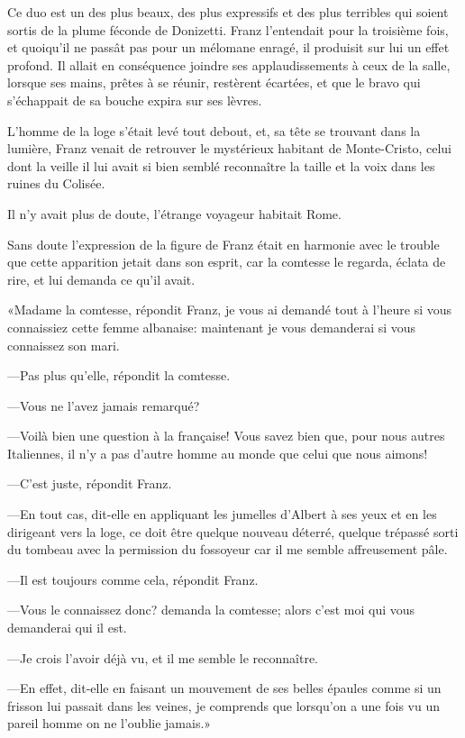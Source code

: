 Ce duo est un des plus beaux, des plus expressifs et des plus terribles qui soient sortis de la plume féconde de Donizetti. Franz l'entendait pour la troisième fois, et quoiqu'il ne passât pas pour un mélomane enragé, il produisit sur lui un effet profond. Il allait en conséquence joindre ses applaudissements à ceux de la salle, lorsque ses mains, prêtes à se réunir, restèrent écartées, et que le bravo qui s'échappait de sa bouche expira sur ses lèvres. 

L'homme de la loge s'était levé tout debout, et, sa tête se trouvant dans la lumière, Franz venait de retrouver le mystérieux habitant de Monte-Cristo, celui dont la veille il lui avait si bien semblé reconnaître la taille et la voix dans les ruines du Colisée. 

Il n'y avait plus de doute, l'étrange voyageur habitait Rome. 

Sans doute l'expression de la figure de Franz était en harmonie avec le trouble que cette apparition jetait dans son esprit, car la comtesse le regarda, éclata de rire, et lui demanda ce qu'il avait. 

«Madame la comtesse, répondit Franz, je vous ai demandé tout à l'heure si vous connaissiez cette femme albanaise: maintenant je vous demanderai si vous connaissez son mari. 

—Pas plus qu'elle, répondit la comtesse. 

—Vous ne l'avez jamais remarqué? 

—Voilà bien une question à la française! Vous savez bien que, pour nous autres Italiennes, il n'y a pas d'autre homme au monde que celui que nous aimons! 

—C'est juste, répondit Franz. 

—En tout cas, dit-elle en appliquant les jumelles d'Albert à ses yeux et en les dirigeant vers la loge, ce doit être quelque nouveau déterré, quelque trépassé sorti du tombeau avec la permission du fossoyeur car il me semble affreusement pâle. 

—Il est toujours comme cela, répondit Franz. 

—Vous le connaissez donc? demanda la comtesse; alors c'est moi qui vous demanderai qui il est. 

—Je crois l'avoir déjà vu, et il me semble le reconnaître. 

—En effet, dit-elle en faisant un mouvement de ses belles épaules comme si un frisson lui passait dans les veines, je comprends que lorsqu'on a une fois vu un pareil homme on ne l'oublie jamais.» 

